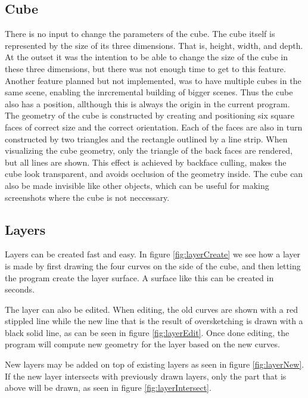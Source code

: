 \documentclass[a4paper,12pt]{report}
\begin{document}
\subsection{Cube}
There is no input to change the parameters of the cube. The cube itself is represented by the size of its three dimensions. That is, height, width, and depth. At the outset it was the intention to be able to change the size of the cube in these three dimensions, but there was not enough time to get to this feature. Another feature planned but not implemented, was to have multiple cubes in the same scene, enabling the inrcremental building of bigger scenes. Thus the cube also has a position, allthough this is always the origin in the current program. The geometry of the cube is constructed by creating and positioning six square faces of correct size and the correct orientation. Each of the faces are also in turn constructed by two triangles and the rectangle outlined by a line strip. When visualizing the cube geometry, only the triangle of the back faces are rendered, but all lines are shown. This effect is achieved by backface culling, makes the cube look transparent, and avoids occlusion of the geometry 
inside. The cube can also be made invisible like other objects, which can be useful for making screenshots where the cube is not neccessary.

\subsection{Layers}
Layers can be created fast and easy. In figure \ref{fig:layerCreate} we see how a layer is made by first drawing the four curves on the side of the cube, and then letting the program create the layer surface. A surface like this can be created in seconds.

The layer can also be edited. When editing, the old curves are shown with a red stippled line while the new line that is the result of oversketching is drawn with a black solid line, as can be seen in figure \ref{fig:layerEdit}. Once done editing, the program will compute new geometry for the layer based on the new curves.

New layers may be added on top of existing layers as seen in figure \ref{fig:layerNew}. If the new layer intersects with previously drawn layers, only the part that is above will be drawn, as seen in figure \ref{fig:layerIntersect}.
\end{document}

